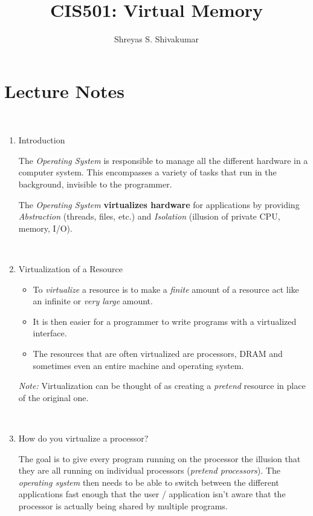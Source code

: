 \documentclass[12pt]{article}
\title{CIS501: Virtual Memory}
\author[1]{Shreyas S. Shivakumar}
\newenvironment{QandA}{\begin{enumerate}[label=\bfseries\arabic*.]\bfseries}
                      {\end{enumerate}}
\newenvironment{answered}{\par\quad\normalfont}{}
\begin{document}
\maketitle

\section{Lecture Notes}

\ 

\begin{QandA}
\item Introduction
\begin{answered}
The \textit{Operating System} is responsible to manage all the different hardware in a computer system. This encompasses a variety of tasks that run in the background, invisible to the programmer. 

\quad The \textit{Operating System} \textbf{virtualizes hardware} for applications by providing \textit{Abstraction} (threads, files, etc.) and \textit{Isolation} (illusion of private CPU, memory, I/O).
\end{answered}

\ 

\item Virtualization of a Resource
\begin{answered}
\vspace{-0.85cm}
\begin{itemize}
    \item To \textit{virtualize} a resource is to make a \textit{finite} amount of a resource act like an infinite or \textit{very large} amount.
    \item It is then easier for a programmer to write programs with a virtualized interface.
    \item The resources that are often virtualized are processors, DRAM and sometimes even an entire machine and operating system.
\end{itemize}
\textit{Note:} Virtualization can be thought of as creating a \textit{pretend} resource in place of the original one. 
\end{answered}

\ 

\item How do you virtualize a processor?
\begin{answered}
The goal is to give every program running on the processor the illusion that they are all running on individual processors (\textit{pretend processors}). The \textit{operating system} then needs to be able to switch between the different applications fast enough that the user / application isn't aware that the processor is actually being shared by multiple programs. 


\end{answered}
\end{QandA}
\end{document}
